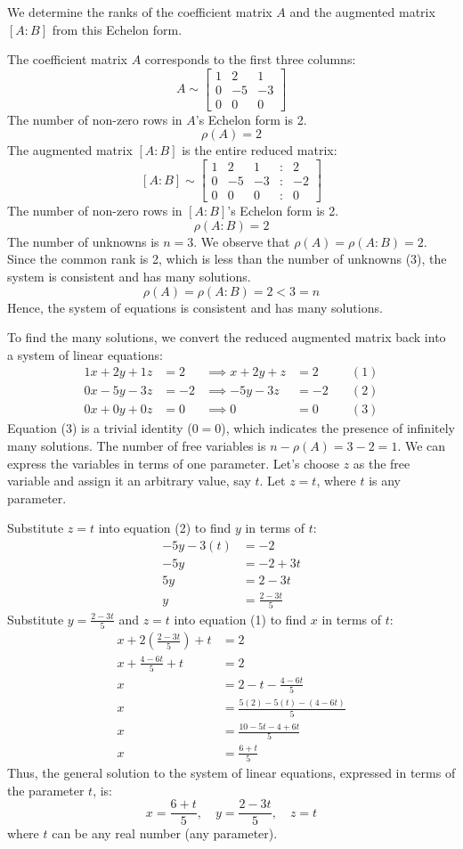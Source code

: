 \documentclass{article}
\begin{document}
We determine the ranks of the coefficient matrix $A$ and the augmented matrix $[A:B]$ from this Echelon form.

The coefficient matrix $A$ corresponds to the first three columns:
\[ A \sim \begin{bmatrix} 1 & 2 & 1 \\ 0 & -5 & -3 \\ 0 & 0 & 0 \end{bmatrix} \]
The number of non-zero rows in $A$'s Echelon form is 2.
\[ \rho(A) = 2 \]
The augmented matrix $[A:B]$ is the entire reduced matrix:
\[ [A:B] \sim \begin{bmatrix} 1 & 2 & 1 & : & 2 \\ 0 & -5 & -3 & : & -2 \\ 0 & 0 & 0 & : & 0 \end{bmatrix} \]
The number of non-zero rows in $[A:B]$'s Echelon form is 2.
\[ \rho(A:B) = 2 \]
The number of unknowns is $n=3$.
We observe that $\rho(A) = \rho(A:B) = 2$.
Since the common rank is 2, which is less than the number of unknowns (3), the system is consistent and has many solutions.
\[ \rho(A) = \rho(A:B) = 2 < 3 = n \]
Hence, the system of equations is consistent and has many solutions.

To find the many solutions, we convert the reduced augmented matrix back into a system of linear equations:
\begin{align*} 1x + 2y + 1z &= 2 &\implies x + 2y + z &= 2 \quad &(1) \\ 0x - 5y - 3z &= -2 &\implies -5y - 3z &= -2 \quad &(2) \\ 0x + 0y + 0z &= 0 &\implies 0 &= 0 \quad &(3) \end{align*}
Equation (3) is a trivial identity ($0=0$), which indicates the presence of infinitely many solutions. The number of free variables is $n - \rho(A) = 3 - 2 = 1$. We can express the variables in terms of one parameter. Let's choose $z$ as the free variable and assign it an arbitrary value, say $t$.
Let $z = t$, where $t$ is any parameter.

Substitute $z=t$ into equation (2) to find $y$ in terms of $t$:
\begin{align*} -5y - 3(t) &= -2 \\ -5y &= -2 + 3t \\ 5y &= 2 - 3t \\ y &= \frac{2 - 3t}{5} \end{align*}
Substitute $y = \frac{2 - 3t}{5}$ and $z=t$ into equation (1) to find $x$ in terms of $t$:
\begin{align*} x + 2\left(\frac{2 - 3t}{5}\right) + t &= 2 \\ x + \frac{4 - 6t}{5} + t &= 2 \\ x &= 2 - t - \frac{4 - 6t}{5} \\ x &= \frac{5(2) - 5(t) - (4 - 6t)}{5} \\ x &= \frac{10 - 5t - 4 + 6t}{5} \\ x &= \frac{6 + t}{5} \end{align*}
Thus, the general solution to the system of linear equations, expressed in terms of the parameter $t$, is:
\[ x = \frac{6 + t}{5}, \quad y = \frac{2 - 3t}{5}, \quad z = t \]
where $t$ can be any real number (any parameter).
\end{document}
